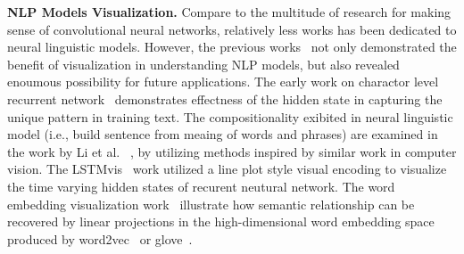 
\textbf{NLP Models Visualization.}
Compare to the multitude of research for making sense of convolutional neural networks, relatively less works has been dedicated to neural linguistic models.
%
However, the previous works~\cite{KarpathyJohnson2015, LiChenHovy2015, StrobeltGehrmannPfister2018, LiuBremerJayaraman2018} not only demonstrated the benefit of visualization in understanding NLP models, but also revealed enoumous possibility for future applications.
The early work on charactor level recurrent network~\cite{KarpathyJohnson2015} demonstrates effectness of the hidden state in capturing the unique pattern in training text. The compositionality exibited in neural linguistic model (i.e., build sentence from meaing of words and phrases) are examined in the work by Li et al. ~\cite{LiChenHovy2015}, by utilizing methods inspired by similar work in computer vision.
The LSTMvis~\cite{StrobeltGehrmannPfister2018} work utilized a line plot style visual encoding to visualize the time varying hidden states of recurent neutural network. The word embedding visualization work~\cite{LiuBremerJayaraman2018} illustrate how semantic relationship can be recovered by linear projections in the high-dimensional word embedding space produced by word2vec~\cite{MikolovSutskeverChen2013} or glove~\cite{PenningtonSocherManning2014}.
